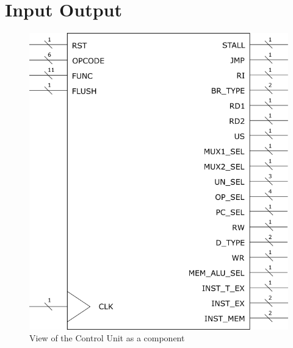 \section{Input Output}
\begin{figure}[h]
	\centering
	\includegraphics[scale=0.5]{chapters/figures/DLX_CU}
	\caption{View of the Control Unit as a component}
	\label{cu_comp}
\end{figure}

